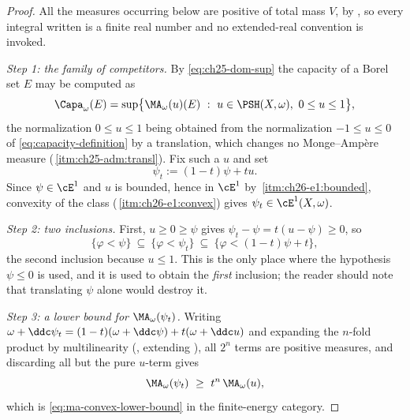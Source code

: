 \begin{proof}
All the measures occurring below are positive of total mass \(V\), by
, so every integral written is a finite real
number and no extended-real convention is invoked.

\emph{Step 1: the family of competitors.}  By
\eqref{eq:ch25-dom-sup} the capacity of a Borel set \(E\) may be computed
as
\begin{equation}
\label{eq:ch29-capacity-as-sup}
 \Capa_\omega(E)
 =\sup\bigl\{\MA_\omega(u)(E)\ :\ u\in\PSH(X,\omega),\ 0\leq u\leq1\bigr\},
\end{equation}
the normalization \(0\leq u\leq1\) being obtained from the normalization
\(-1\leq u\leq0\) of \eqref{eq:capacity-definition} by a translation, which
changes no Monge--Amp\`ere measure
(\,\cref{itm:ch25-adm:transl}).  Fix such
a \(u\) and set
\[
 \psi_t:=(1-t)\psi+tu .
\]
Since \(\psi\in\cE^1\) and \(u\) is bounded, hence in \(\cE^1\) by
\,\cref{itm:ch26-e1:bounded}, convexity of the
class (\,\cref{itm:ch26-e1:convex}) gives
\(\psi_t\in\cE^1(X,\omega)\).

\emph{Step 2: two inclusions.}  First, \(u\geq0\geq\psi\) gives
\(\psi_t-\psi=t(u-\psi)\geq0\), so
\begin{equation}
\label{eq:ch29-two-inclusions}
 \{\varphi<\psi\}\ \subseteq\ \{\varphi<\psi_t\}
 \ \subseteq\ \{\varphi<(1-t)\psi+t\},
\end{equation}
the second inclusion because \(u\leq1\).  This is the only place where the
hypothesis \(\psi\leq0\) is used, and it is used to obtain the \emph{first}
inclusion; the reader should note that translating \(\psi\) alone would
destroy it.

\emph{Step 3: a lower bound for \(\MA_\omega(\psi_t)\).}  Writing
\(\omega+\ddc\psi_t=(1-t)(\omega+\ddc\psi)+t(\omega+\ddc u)\) and expanding
the \(n\)-fold product by multilinearity
(, extending
), all \(2^n\) terms are positive
measures, and discarding all but the pure \(u\)-term gives
\begin{equation}
\label{eq:ch29-convexity-lower-bound}
 \MA_\omega(\psi_t)\ \geq\ t^n\,\MA_\omega(u),
\end{equation}
which is \eqref{eq:ma-convex-lower-bound} in the finite-energy category.


\end{proof}

